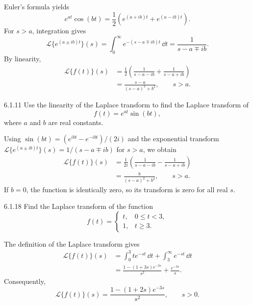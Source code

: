 \documentclass[11pt,oneside]{article}
\begin{document}
\begin{solution}
Euler's formula yields
\[
    e^{at}\cos(bt)=\frac12\left(e^{(a+ib)t}+e^{(a-ib)t}\right).
\]
For $s>a$, integration gives
\[
    \mathcal{L}\{e^{(a\pm ib)t}\}(s)=\int_0^\infty e^{-(s-a\mp ib)t}\,\dd t
    =\frac{1}{s-a\mp ib}.
\]
By linearity,
\[
    \begin{aligned}
    \mathcal{L}\{f(t)\}(s)
      &=\frac12\left(\frac{1}{s-a-ib}+\frac{1}{s-a+ib}\right)\\
      &=\boxed{\frac{s-a}{(s-a)^2+b^2}}, \qquad s>a.
    \end{aligned}
\]
\end{solution}

\begin{problem}{6.1.11}
Use the linearity of the Laplace transform to find the Laplace transform of
\[
    f(t)=e^{at}\sin(bt),
\]
where $a$ and $b$ are real constants.
\end{problem}

\begin{solution}
Using $\sin(bt)=(e^{ibt}-e^{-ibt})/(2i)$ and the exponential transform $\mathcal{L}\{e^{(a\pm ib)t}\}(s)=1/(s-a\mp ib)$ for $s>a$, we obtain
\[
    \begin{aligned}
    \mathcal{L}\{f(t)\}(s)
      &=\frac{1}{2i}\left(\frac{1}{s-a-ib}-\frac{1}{s-a+ib}\right)\\
      &=\boxed{\frac{b}{(s-a)^2+b^2}}, \qquad s>a.
    \end{aligned}
\]
If $b=0$, the function is identically zero, so its transform is zero for all real $s$.
\end{solution}

\begin{problem}{6.1.18}
Find the Laplace transform of the function
\[
    f(t)=
    \begin{cases}
        t, & 0\leq t<3,\\
        1, & t\geq3.
    \end{cases}
\]
\end{problem}

\begin{solution}
The definition of the Laplace transform gives
\[
    \begin{aligned}
    \mathcal{L}\{f(t)\}(s)
      &=\int_0^3te^{-st}\,\dd t+\int_3^\infty e^{-st}\,\dd t\\
      &=\frac{1-(1+3s)e^{-3s}}{s^2}+\frac{e^{-3s}}{s}.
    \end{aligned}
\]
Consequently,
\[
    \boxed{\mathcal{L}\{f(t)\}(s)=\frac{1-(1+2s)e^{-3s}}{s^2}},
    \qquad s>0.
\]
\end{solution}
\end{document}
